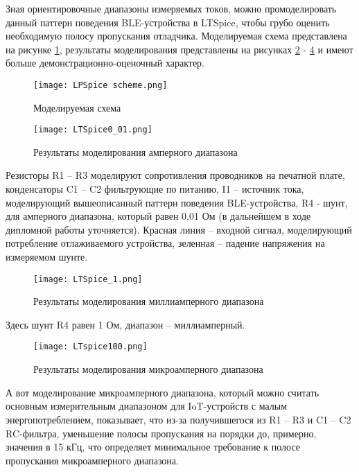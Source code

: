 Зная ориентировочные диапазоны измеряемых токов, можно промоделировать данный паттерн 
поведения BLE-устройства в LTSpice, чтобы грубо оценить необходимую полосу пропускания отладчика. 
Моделируемая схема представлена на рисунке \ref{ris:LTSpiceScheme}, результаты моделирования 
представлены на рисунках \ref{ris:LTSpice0_01} - \ref{ris:LTSpice100} и имеют больше 
демонстрационно-оценочный характер.

\begin{figure}[H]
  \centering
  \texttt{[image: LPSpice scheme.png]}
  \caption{Моделируемая схема}
  \label{ris:LTSpiceScheme}
\end{figure}

\begin{figure}[H]
  \centering
  \texttt{[image: LTSpice0\_01.png]}
  \caption{Результаты моделирования амперного диапазона }
  \label{ris:LTSpice0_01}
\end{figure}

Резисторы R1 -- R3 моделируют сопротивления проводников на печатной плате, конденсаторы C1 -- C2 фильтрующие 
по питанию, I1 -- источник тока, моделирующий вышеописанный паттерн поведения BLE-устройства,
R4 - шунт, для амперного диапазона, который равен 0,01 Ом (в дальнейшем в ходе дипломной работы уточняется). 
Красная линия -- входной сигнал, моделирующий потребление отлаживаемого устройства, 
зеленная -- падение напряжения на измеряемом шунте. 

\begin{figure}[H]
  \centering
  \texttt{[image: LTSpice\_1.png]}
  \caption{Результаты моделирования миллиамперного диапазона }
  \label{ris:LTSpice_1}
\end{figure}

Здесь шунт R4 равен 1 Ом, диапазон -- миллиамперный. 

\begin{figure}[H]
  \centering
  \texttt{[image: LTspice100.png]}
  \caption{Результаты моделирования микроамперного диапазона }
  \label{ris:LTSpice100}
\end{figure}

А вот моделирование микроамперного диапазона, который можно считать основным измерительным диапазоном для 
IoT-устройств с малым энергопотреблением, показывает, что из-за получившегося из R1 -- R3 и C1 -- C2 RC-фильтра,
уменьшение полосы пропускания на порядки до, примерно, значения в 15 кГц, что определяет минимальное
требование к полосе пропускания микроамперного диапазона. 
  

